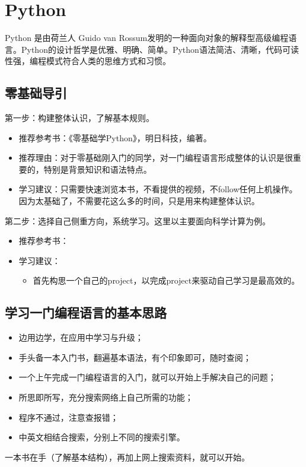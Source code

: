 \chapter{Python}
Python 是由荷兰人 Guido van Rossum发明的一种面向对象的解释型高级编程语言。Python的设计哲学是优雅、明确、简单。Python语法简洁、清晰，代码可读性强，编程模式符合人类的思维方式和习惯。



\section{零基础导引}
第一步：构建整体认识，了解基本规则。
\begin{itemize}
\item 推荐参考书：《零基础学Python》，明日科技，编著。

\item 推荐理由：对于零基础刚入门的同学，对一门编程语言形成整体的认识是很重要的，特别是背景知识和语法特点。

\item 学习建议：只需要快速浏览本书，不看提供的视频，不follow任何上机操作。因为太基础了，不需要花这么多的时间，只是用来构建整体认识。
\end{itemize}

第二步：选择自己侧重方向，系统学习。这里以主要面向科学计算为例。
\begin{itemize}
\item 推荐参考书：

\item 学习建议：
	\begin{itemize}
	\item 首先构思一个自己的project，以完成project来驱动自己学习是最高效的。
	\end{itemize}
\end{itemize}


\section{学习一门编程语言的基本思路}
\begin{itemize}
\item 边用边学，在应用中学习与升级；
\item 手头备一本入门书，翻遍基本语法，有个印象即可，随时查阅；
\item 一个上午完成一门编程语言的入门，就可以开始上手解决自己的问题；
\item 所思即所写，充分搜索网络上自己所需的功能；
\item 程序不通过，注意查报错；
\item 中英文相结合搜索，分别上不同的搜索引擎。
\end{itemize}
一本书在手（了解基本结构），再加上网上搜索资料，就可以开始。


